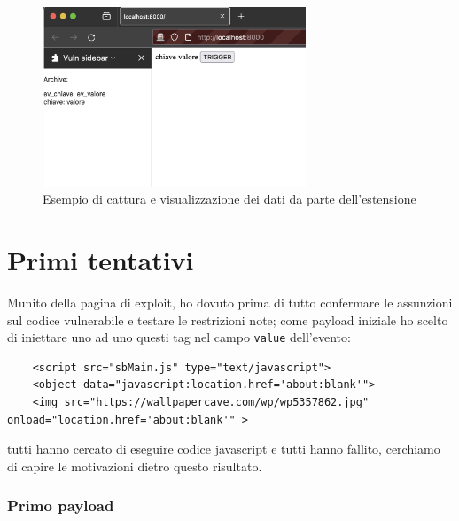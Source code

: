 \documentclass{sapthesis}
\newcommand{\code}[1]{\texttt{#1}}
\begin{document}
        \begin{figure}[ht]
            \centering                                                  
            \includegraphics[width=0.7\textwidth]{sidebar-key-value-example.png}
            \caption{ Esempio di cattura e visualizzazione dei dati da parte dell'estensione }
            \label{fig:sidebar-key-value-example}                             
        \end{figure}

    \section{Primi tentativi}
    \label{sec:attaccando-vuln-tentativi}
        Munito della pagina di exploit, ho dovuto prima di tutto confermare le assunzioni sul
        codice vulnerabile e testare le restrizioni note; come payload iniziale ho scelto
        di iniettare uno ad uno questi tag nel campo \code{value} dell'evento:
        \begin{lstlisting}
    <script src="sbMain.js" type="text/javascript">
    <object data="javascript:location.href='about:blank'">
    <img src="https://wallpapercave.com/wp/wp5357862.jpg" onload="location.href='about:blank'" >
\end{lstlisting}
        tutti hanno cercato di eseguire codice javascript e tutti hanno fallito, cerchiamo di capire
        le motivazioni dietro questo risultato.

        \subsubsection{Primo payload}
\end{document}
